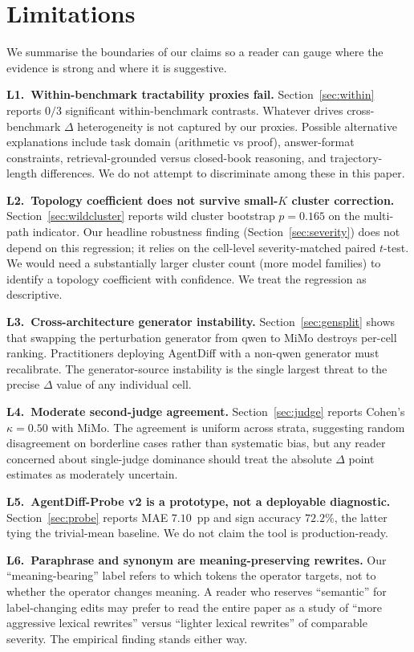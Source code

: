 \documentclass[11pt]{article}
\begin{document}
\section*{Limitations}

We summarise the boundaries of our claims so a reader can gauge where the evidence is strong and where it is suggestive.

\textbf{L1.~Within-benchmark tractability proxies fail.} Section~\ref{sec:within} reports $0/3$ significant within-benchmark contrasts. Whatever drives cross-benchmark $\Delta$ heterogeneity is not captured by our proxies. Possible alternative explanations include task domain (arithmetic vs proof), answer-format constraints, retrieval-grounded versus closed-book reasoning, and trajectory-length differences. We do not attempt to discriminate among these in this paper.

\textbf{L2.~Topology coefficient does not survive small-$K$ cluster correction.} Section~\ref{sec:wildcluster} reports wild cluster bootstrap $p=0.165$ on the multi-path indicator. Our headline robustness finding (Section~\ref{sec:severity}) does not depend on this regression; it relies on the cell-level severity-matched paired $t$-test. We would need a substantially larger cluster count (more model families) to identify a topology coefficient with confidence. We treat the regression as descriptive.

\textbf{L3.~Cross-architecture generator instability.} Section~\ref{sec:gensplit} shows that swapping the perturbation generator from qwen to MiMo destroys per-cell ranking. Practitioners deploying AgentDiff with a non-qwen generator must recalibrate. The generator-source instability is the single largest threat to the precise $\Delta$ value of any individual cell.

\textbf{L4.~Moderate second-judge agreement.} Section~\ref{sec:judge} reports Cohen's $\kappa = 0.50$ with MiMo. The agreement is uniform across strata, suggesting random disagreement on borderline cases rather than systematic bias, but any reader concerned about single-judge dominance should treat the absolute $\Delta$ point estimates as moderately uncertain.

\textbf{L5.~AgentDiff-Probe v2 is a prototype, not a deployable diagnostic.} Section~\ref{sec:probe} reports MAE $7.10$~pp and sign accuracy $72.2\%$, the latter tying the trivial-mean baseline. We do not claim the tool is production-ready.

\textbf{L6.~Paraphrase and synonym are meaning-preserving rewrites.} Our ``meaning-bearing'' label refers to which tokens the operator targets, not to whether the operator changes meaning. A reader who reserves ``semantic'' for label-changing edits may prefer to read the entire paper as a study of ``more aggressive lexical rewrites'' versus ``lighter lexical rewrites'' of comparable severity. The empirical finding stands either way.
\end{document}
